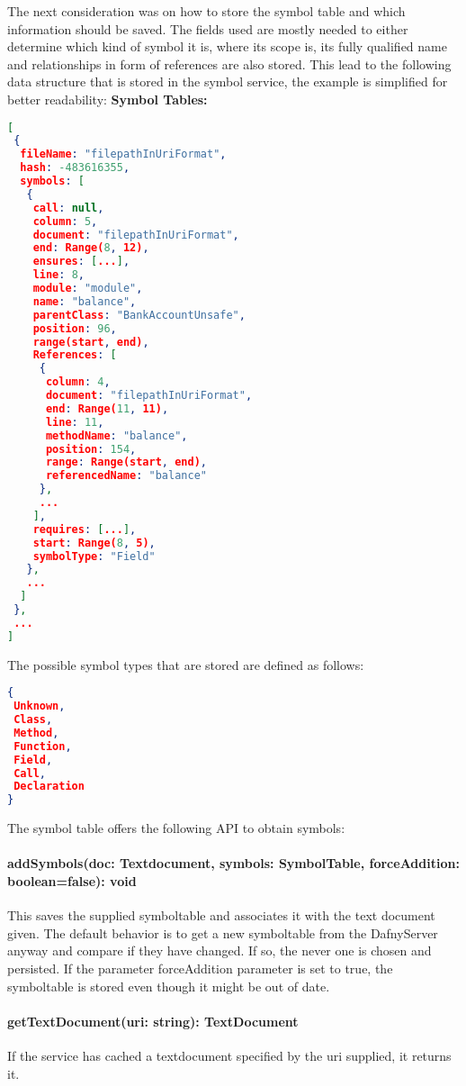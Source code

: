 The next consideration was on how to store the symbol table and which information should be saved. The fields used are mostly needed to either determine which kind of symbol it is, where its scope is, its fully qualified name and relationships in form of references are also stored. This lead to the following data structure that is stored in the symbol service, the example is simplified for better readability: \newline
\newline\newline
\textbf{Symbol Tables: }
\begin{lstlisting}[language=json,firstnumber=1]
[
 {
  fileName: "filepathInUriFormat",
  hash: -483616355,
  symbols: [
   {
    call: null,
    column: 5,
    document: "filepathInUriFormat",
    end: Range(8, 12),
    ensures: [...],
    line: 8,
    module: "module",
    name: "balance",
    parentClass: "BankAccountUnsafe",
    position: 96,
    range(start, end),
    References: [
     {
      column: 4,
      document: "filepathInUriFormat",
      end: Range(11, 11),
      line: 11,
      methodName: "balance",
      position: 154,
      range: Range(start, end),
      referencedName: "balance"
     },
     ...
    ],
    requires: [...],
    start: Range(8, 5),
    symbolType: "Field"
   },
   ...
  ]
 },
 ...
]
\end{lstlisting}

The possible symbol types that are stored are defined as follows:
\begin{lstlisting}[language=json,firstnumber=1]
{
 Unknown,
 Class,
 Method,
 Function,
 Field,
 Call,
 Declaration	
}

\end{lstlisting}
The symbol table offers the following API to obtain symbols: \newline
\paragraph{addSymbols(doc: Textdocument, symbols: SymbolTable, forceAddition: boolean=false): void} This saves the supplied symboltable and associates it with the text document given. The default behavior is to get a new symboltable from the DafnyServer anyway and compare if they have changed. If so, the never one is chosen and persisted. If the parameter forceAddition parameter is set to true, the symboltable is stored even though it might be out of date.

\paragraph{getTextDocument(uri: string): TextDocument} If the service has cached a textdocument specified by the uri supplied, it returns it.

